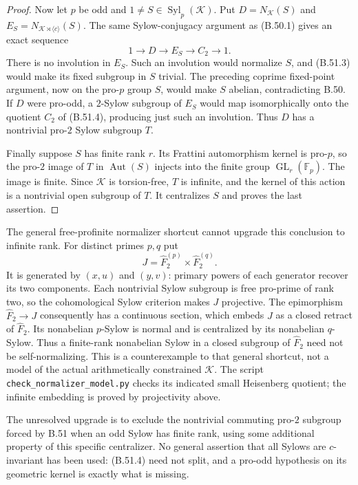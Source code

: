\begin{proof}
Now let $p$ be odd and
$1\ne S\in\operatorname{Syl}_p(\mathcal K)$.
Put $D=N_{\mathcal K}(S)$ and
$E_S=N_{\mathcal K\rtimes\langle c\rangle}(S)$.
The same Sylow-conjugacy argument
as (B.50.1) gives an exact sequence
\[
                      1\longrightarrow D\longrightarrow E_S
                        \longrightarrow C_2\longrightarrow1.
                                                               \tag{B.51.4}
\]
There is no involution in $E_S$.
Such an involution would normalize
$S$, and (B.51.3) would make
its fixed subgroup in $S$
trivial.  The preceding coprime
fixed-point argument, now on
the pro-$p$ group $S$, would
make $S$ abelian, contradicting
B.50.  If $D$ were pro-odd,
a $2$-Sylow subgroup of $E_S$
would map isomorphically onto
the quotient $C_2$ of (B.51.4),
producing just such an involution.
Thus $D$ has a nontrivial
pro-$2$ Sylow subgroup $T$.

Finally suppose $S$ has finite
rank $r$.  Its Frattini
automorphism kernel is pro-$p$,
so the pro-$2$ image of $T$
in $\operatorname{Aut}(S)$
injects into the finite group
$\operatorname{GL}_r(\mathbb F_p)$.
The image is finite.  Since
$\mathcal K$ is torsion-free,
$T$ is infinite, and the
kernel of this action is
a nontrivial open subgroup
of $T$.  It centralizes $S$
and proves the last assertion.
\end{proof}

The general free-profinite
normalizer shortcut cannot
upgrade this conclusion to
infinite rank.  For distinct
primes $p,q$ put
\[
               J=\widehat F_2^{(p)}\times\widehat F_2^{(q)}.
                                                               \tag{B.51.5}
\]
It is generated by $(x,u)$
and $(y,v)$: primary powers
of each generator recover
its two components.  Each
nontrivial Sylow subgroup
is free pro-prime of rank
two, so the cohomological
Sylow criterion makes $J$
projective.  The epimorphism
$\widehat F_2\to J$ consequently
has a continuous section,
which embeds $J$ as a closed
retract of $\widehat F_2$.
Its nonabelian $p$-Sylow is
normal and is centralized
by its nonabelian $q$-Sylow.
Thus a finite-rank nonabelian
Sylow in a closed subgroup
of $\widehat F_2$ need not
be self-normalizing.
This is a counterexample
to that general shortcut,
not a model of the actual
arithmetically constrained
$\mathcal K$.  The script
\texttt{check\_normalizer\_model.py}
checks its indicated small
Heisenberg quotient; the
infinite embedding is proved
by projectivity above.

The unresolved upgrade is
to exclude the nontrivial
commuting pro-$2$ subgroup
forced by B.51 when an odd
Sylow has finite rank, using
some additional property of
this specific centralizer.
No general assertion that
all Sylows are $c$-invariant
has been used: (B.51.4)
need not split, and a
pro-odd hypothesis on its
geometric kernel is exactly
what is missing.
